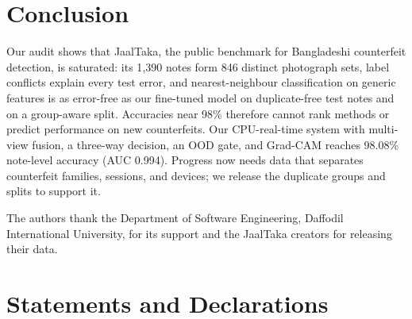 \documentclass[pdflatex,sn-mathphys-num]{sn-jnl}
\begin{document}
\section{Conclusion}\label{sec:conclusion}

Our audit shows that JaalTaka, the public benchmark for Bangladeshi counterfeit
detection, is saturated: its 1{,}390 notes form 846 distinct photograph sets, label
conflicts explain every test error, and nearest-neighbour classification on generic
features is as error-free as our fine-tuned model on duplicate-free test notes and on a
group-aware split.
Accuracies near 98\% therefore cannot rank methods or predict performance on new
counterfeits. Our CPU-real-time system with multi-view fusion, a three-way decision, an
OOD gate, and Grad-CAM reaches 98.08\% note-level accuracy (AUC 0.994). Progress now
needs data that separates counterfeit families, sessions, and devices; we release the
duplicate groups and splits to support it.

\backmatter

The authors thank the Department of Software Engineering, Daffodil International
University, for its support and the JaalTaka creators for releasing their data.

\section*{Statements and Declarations}
\end{document}
